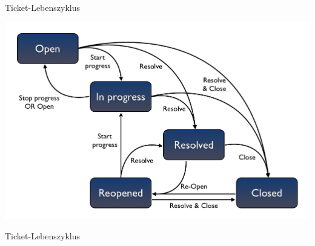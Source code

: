 \documentclass{beamer}
\begin{document}
\begin{frame}{Ticket-Lebenszyklus}
	\begin{center}
		\includegraphics[scale=.5]{jira-ticket-lifecycle.png}
	\end{center}
\end{frame}

\begin{frame}{Ticket-Lebenszyklus}
	\resizebox{!}{.75\textheight}{
		
	}
\end{frame}
\end{document}
